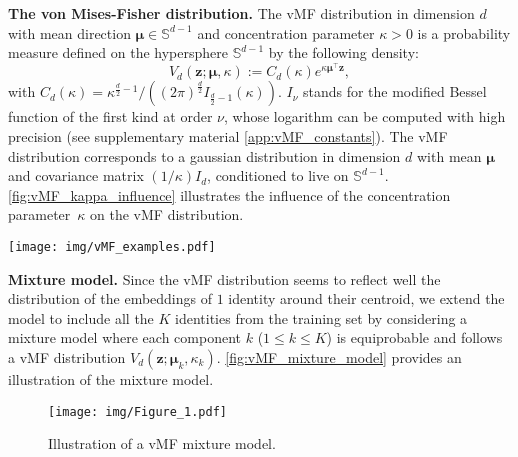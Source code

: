 \documentclass[nohyperref]{article}
\theoremstyle{plain}
\theoremstyle{definition}
\theoremstyle{remark}
\newcommand{\vect}[1]{{\bm{#1}}}
\begin{document}
{\bf The von Mises-Fisher distribution.} The vMF distribution in dimension $d$ with mean direction $\vect{\mu} \in \mathbb{S}^{d-1}$ and concentration parameter $\kappa > 0$ is a probability measure defined on the hypersphere $\mathbb{S}^{d-1}$ by the following density:
\[ V_d( \vect{z} ; \vect{\mu}, \kappa) := C_d(\kappa) e^{\displaystyle \kappa  \vect{\mu}^\intercal \vect{z}},  \]
with $C_d(\kappa) = \kappa^{\frac{d}{2} - 1} / ((2 \pi)^{\frac{d}{2}} I_{\frac{d}{2} - 1}(\kappa) )$. $I_\nu$ stands for the modified Bessel function of the first kind at order $\nu$, whose logarithm can be computed with high precision (see supplementary material \ref{app:vMF_constants}). The vMF distribution corresponds to a gaussian distribution in dimension $d$ with mean $\vect{\mu}$ and
covariance matrix $(1/\kappa)I_d$, conditioned to live on $\mathbb{S}^{d-1}$.
\autoref{fig:vMF_kappa_influence} illustrates the influence of the concentration parameter~$\kappa$ on the vMF distribution.

\begin{figure*}[ht!]
    \centering
    \texttt{[image: img/vMF\_examples.pdf]}
    \caption{$500$ samples from the vMF distribution in dimension $3$ with parameters $\vect{\mu} =$ [$0.5$, $0$, $\sqrt{0.75}$] and $\kappa > 0$.}
    \label{fig:vMF_kappa_influence}
\end{figure*}

{\bf Mixture model.} Since the vMF distribution seems to reflect well the distribution of the embeddings of $1$ identity around their centroid, we extend the model to include all the $K$ identities from the training set by considering a mixture model where each component $k$ ($1 \leq k \leq K$) is equiprobable and follows a vMF distribution $V_d( \vect{z} ; \vect{\mu}_k, \kappa_k)$. \autoref{fig:vMF_mixture_model} provides an illustration of the mixture model.

\begin{figure}
\vspace{-0.3cm}
    \centering
    \texttt{[image: img/Figure\_1.pdf]}
    \caption{Illustration of a
vMF mixture model.}
    \vspace{-0.5cm}
    \label{fig:vMF_mixture_model}
\end{figure}
\end{document}
